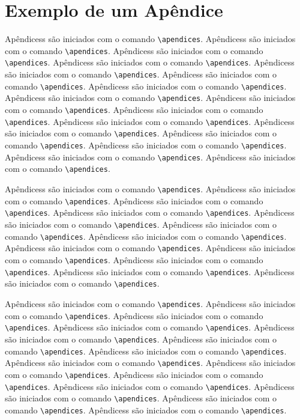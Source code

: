 \chapter{Exemplo de um Apêndice}\label{apend:1}

Apêndicess são iniciados com o comando \verb|\apendices|.
Apêndicess são iniciados com o comando \verb|\apendices|.
Apêndicess são iniciados com o comando \verb|\apendices|.
Apêndicess são iniciados com o comando \verb|\apendices|.
Apêndicess são iniciados com o comando \verb|\apendices|.
Apêndicess são iniciados com o comando \verb|\apendices|.
Apêndicess são iniciados com o comando \verb|\apendices|.
Apêndicess são iniciados com o comando \verb|\apendices|.
Apêndicess são iniciados com o comando \verb|\apendices|.
Apêndicess são iniciados com o comando \verb|\apendices|.
Apêndicess são iniciados com o comando \verb|\apendices|.
Apêndicess são iniciados com o comando \verb|\apendices|.
Apêndicess são iniciados com o comando \verb|\apendices|.
Apêndicess são iniciados com o comando \verb|\apendices|.
Apêndicess são iniciados com o comando \verb|\apendices|.
Apêndicess são iniciados com o comando \verb|\apendices|.

Apêndicess são iniciados com o comando \verb|\apendices|.
Apêndicess são iniciados com o comando \verb|\apendices|.
Apêndicess são iniciados com o comando \verb|\apendices|.
Apêndicess são iniciados com o comando \verb|\apendices|.
Apêndicess são iniciados com o comando \verb|\apendices|.
Apêndicess são iniciados com o comando \verb|\apendices|.
Apêndicess são iniciados com o comando \verb|\apendices|.
Apêndicess são iniciados com o comando \verb|\apendices|.
Apêndicess são iniciados com o comando \verb|\apendices|.
Apêndicess são iniciados com o comando \verb|\apendices|.
Apêndicess são iniciados com o comando \verb|\apendices|.
Apêndicess são iniciados com o comando \verb|\apendices|.

Apêndicess são iniciados com o comando \verb|\apendices|.
Apêndicess são iniciados com o comando \verb|\apendices|.
Apêndicess são iniciados com o comando \verb|\apendices|.
Apêndicess são iniciados com o comando \verb|\apendices|.
Apêndicess são iniciados com o comando \verb|\apendices|.
Apêndicess são iniciados com o comando \verb|\apendices|.
Apêndicess são iniciados com o comando \verb|\apendices|.
Apêndicess são iniciados com o comando \verb|\apendices|.
Apêndicess são iniciados com o comando \verb|\apendices|.
Apêndicess são iniciados com o comando \verb|\apendices|.
Apêndicess são iniciados com o comando \verb|\apendices|.
Apêndicess são iniciados com o comando \verb|\apendices|.
Apêndicess são iniciados com o comando \verb|\apendices|.
Apêndicess são iniciados com o comando \verb|\apendices|.

